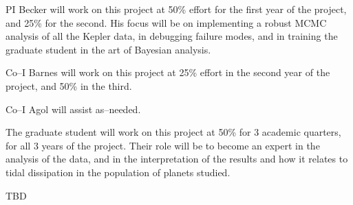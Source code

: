 \pagebreak

\bigskip {}

PI Becker will work on this project at 50\% effort for the first
year of the project, and 25\% for the second.  His focus will be on
implementing a robust MCMC analysis of all the Kepler data, in
debugging failure modes, and in training the graduate student in the
art of Bayesian analysis.

Co--I Barnes will work on this project at 25\% effort in the second
year of the project, and 50\% in the third.  

Co--I Agol will assist as--needed.

The graduate student will work on this project at 50\% for 3 academic
quarters, for all 3 years of the project.  Their role will be to
become an expert in the analysis of the data, and in the
interpretation of the results and how it relates to tidal dissipation
in the population of planets studied.

\bigskip {}

TBD
